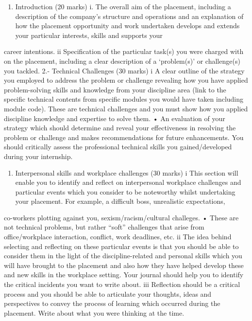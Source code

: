 \documentclass[11pt]{article}
\begin{document}
\begin{enumerate}
\item Introduction (20 marks)
i. The overall aim of the placement, including a description of the company’s structure and operations and an explanation of how the placement opportunity and work undertaken develops and extends your particular interests, skills and supports your
\end{enumerate}
career intentions.
  ii Specification of the particular task(s) you were charged with on the placement, including a clear description of a ‘problem(s)’ or challenge(s) you tackled.
2.- Technical Challenges (30 marks)
 i  A clear outline of the strategy you employed to address the problem or challenge revealing how you have applied problem-solving skills and knowledge from your discipline area (link to the specific technical contents from specific modules you
would have taken including module code). These are technical challenges and you must show how you applied discipline knowledge and expertise to solve them. • An evaluation of your strategy which should determine and reveal your effectiveness
in resolving the problem or challenge and makes recommendations for future enhancements. You should critically assess the professional technical skills you gained/developed during your internship.
\begin{enumerate}
\item Interpersonal skills and workplace challenges (30 marks)
i This section will enable you to identify and reflect on interpersonal workplace challenges and particular events which you consider to be noteworthy whilst undertaking your placement. For example, a difficult boss, unrealistic expectations,
\end{enumerate}
co-workers plotting against you, sexism/racism/cultural challeges. • These are not technical problems, but rather “soft” challenges that arise from office/workplace interaction, conflict, work deadlines, etc.
  ii  The idea behind selecting and reflecting on these particular events is that you should be able to consider them in the light of the discipline-related and personal skills which you will have brought to the placement and also how they have helped develop these and new skills in the workplace setting. Your journal should help you to identify the critical incidents you want to write about. 
  iii  Reflection should be a critical process and you should be able to articulate your thoughts, ideas and perspectives to convey the process of learning which occurred during the placement. Write about what you were thinking at the time.
\end{document}
